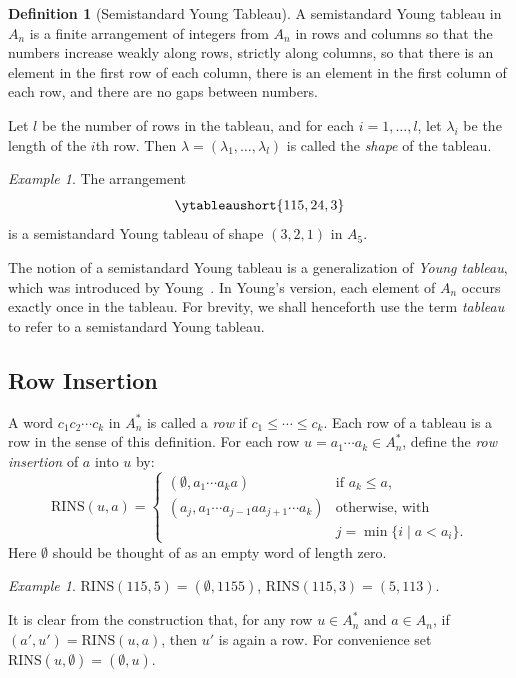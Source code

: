 \documentclass[10pt]{amsproc}
\theoremstyle{definition}
\newtheorem{definition}[theorem]{Definition}
\theoremstyle{remark}
\newtheorem{example}[theorem]{Example}
\newcommand{\rowins}{\mathrm{RINS}}
\begin{document}
\begin{definition}
  [Semistandard Young Tableau]
  \label{definition:ssyt}
  A semistandard Young \linebreak tableau in $A_n$ is a finite arrangement of integers from $A_n$ in rows and columns so that the numbers increase weakly along rows, strictly along columns, so that there is an element in the first row of each column, there is an element in the first column of each row, and there are no gaps between numbers.

  Let $l$ be the number of rows in the tableau, and for each $i=1,\dotsc,l$, let $\lambda_i$ be the length of the $i$th row.
  Then $\lambda=(\lambda_1,\dotsc,\lambda_l)$ is called the \emph{shape} of the tableau.
\end{definition}
\begin{example}
  \label{example:ssyt}
  The arrangement
  \begin{displaymath}
    \ytableaushort{115,24,3}
  \end{displaymath}
  is a semistandard Young tableau of shape $(3,2,1)$ in $A_5$.
\end{example}

The notion of a semistandard Young tableau is a generalization of \emph{Young tableau}, which was introduced by Young~\cite[p.~133]{doi:10.1112/plms/s1-33.1.97}.
In Young's version, each element of $A_n$ occurs exactly once in the tableau.
For brevity, we shall henceforth use the term \emph{tableau} to refer to a semistandard Young tableau.
\subsection{Row Insertion}
\label{sec:row-insertion}
A word $c_1c_2\dotsb c_k$ in $A_n^*$ is called a \emph{row} if $c_1\leq \dotsb \leq c_k$.
Each row of a tableau is a row in the sense of this definition.
For each row $u=a_1\dotsb a_k\in A_n^*$, define the \emph{row insertion} of $a$ into $u$ by:
\begin{displaymath}
  \rowins(u,a) =
  \begin{cases}
    (\emptyset, a_1\dotsb a_k a) & \text{if } a_k\leq a,\\
    (a_j,a_1\dotsb a_{j-1}aa_{j+1}\dotsb a_k) & \text{otherwise, with}\\
    & j=\min\{i\mid a<a_i\}.
  \end{cases}
\end{displaymath}
Here $\emptyset$ should be thought of as an empty word of length zero.
\begin{example}
  $\rowins(115,5) = (\emptyset,1155)$, $\rowins(115,3)=(5,113)$.
\end{example}
It is clear from the construction that, for any row $u\in A_n^*$ and $a\in A_n$, if $(a',u')=\rowins(u,a)$, then $u'$ is again a row.
For convenience set $\rowins(u,\emptyset)=(\emptyset,u)$.
\end{document}
